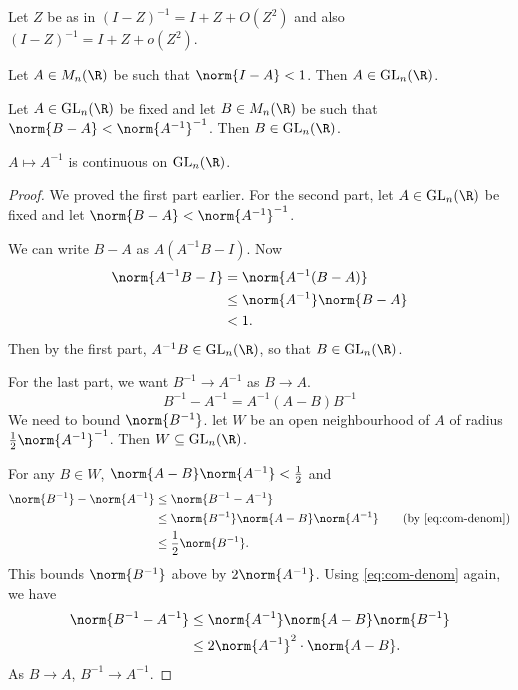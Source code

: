 
\begin{exercise}
    Let $Z$ be as in 
    $(I - Z)^{-1} = I + Z + O(Z^2)$ and also
    $(I - Z)^{-1} = I + Z + o(Z^2)$.
\end{exercise}

\begin{proposition} \label{thm:inv-cont}
    Let $A \in M_n(\R)$ be such that $\norm{I - A} < 1$.
    Then $A \in \GL_n(\R)$.

    Let $A \in \GL_n(\R)$ be fixed and let $B \in M_n(\R)$ be such that
    $\norm{B - A} < \norm{A^{-1}}^{-1}$.
    Then $B \in \GL_n(\R)$.

    $A \mapsto A^{-1}$ is continuous on $\GL_n(\R)$.
\end{proposition}
\begin{proof}
    We proved the first part earlier.
    For the second part, let $A \in \GL_n(\R)$ be fixed and
    let $\norm{B - A} < {\norm{A^{-1}}}^{-1}$.

    We can write $B - A$ as $A(A^{-1}B - I)$.
    Now \begin{align*}
        \norm{A^{-1}B - I} &= \norm{A^{-1} (B - A)} \\
        &\leq \norm{A^{-1}} \norm{B - A} \\
        &< 1.
    \end{align*}
    Then by the first part, $A^{-1}B \in \GL_n(\R)$, so that
    $B \in \GL_n(\R)$.

    For the last part, we want $B^{-1} \to A^{-1}$ as $B \to A$.
    \begin{equation}
        B^{-1} - A^{-1} = A^{-1}(A - B)B^{-1} \label{eq:com-denom}
    \end{equation}
    We need to bound $\norm{B^{-1}}$.
    let $W$ be an open neighbourhood of $A$ of radius
    $\frac12 \norm{A^{-1}}^{-1}$.
    Then $W \subseteq \GL_n(\R)$.

    For any $B \in W$, $\norm{A - B} \norm{A^{-1}} < \frac12$
    and \begin{align*}
        \norm{B^{-1}} - \norm{A^{-1}}
            &\le \norm{B^{-1} - A^{-1}} \\
            &\le \norm{B^{-1}} \norm{A - B} \norm{A^{-1}}
                \tag{by \cref{eq:com-denom}} \\
            &\le \frac12 \norm{B^{-1}}.
    \end{align*}
    This bounds $\norm{B^{-1}}$ above by $2\norm{A^{-1}}$.
    Using \cref{eq:com-denom} again, we have \begin{align*}
        \norm{B^{-1} - A^{-1}}
            &\le \norm{A^{-1}} \norm{A - B} \norm{B^{-1}} \\
            &\le 2 {\norm{A^{-1}}}^2 \cdot \norm{A - B}.
    \end{align*}
    As $B \to A$, $B^{-1} \to A^{-1}$.
\end{proof}
